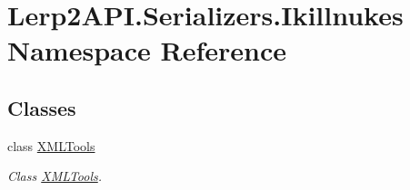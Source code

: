\hypertarget{namespace_lerp2_a_p_i_1_1_serializers_1_1_ikillnukes}{}\section{Lerp2\+A\+P\+I.\+Serializers.\+Ikillnukes Namespace Reference}
\label{namespace_lerp2_a_p_i_1_1_serializers_1_1_ikillnukes}
\subsection*{Classes}
\begin{DoxyCompactItemize}
\item 
class \hyperlink{class_lerp2_a_p_i_1_1_serializers_1_1_ikillnukes_1_1_x_m_l_tools}{X\+M\+L\+Tools}
\begin{DoxyCompactList}\small\item\em Class \hyperlink{class_lerp2_a_p_i_1_1_serializers_1_1_ikillnukes_1_1_x_m_l_tools}{X\+M\+L\+Tools}. \end{DoxyCompactList}\end{DoxyCompactItemize}
